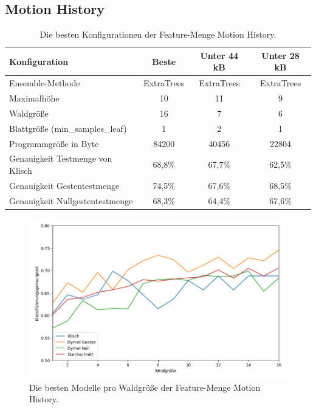 \subsection{Motion History}
\begin{table}[h!]
    \centering
    \begin{tabular}{ | l | c | c | c |}
        \hline
        Konfiguration & Beste & Unter 44 kB & Unter 28 kB \\\hline
        Ensemble-Methode & ExtraTrees & ExtraTrees & ExtraTrees \\\hline
        Maximalhöhe & 10 & 11 & 9 \\\hline
        Waldgröße & 16 & 7 & 6 \\\hline
        Blattgröße (min\_samples\_leaf) & 1 & 2 & 1 \\\hline
        Programmgröße in Byte & 84200 & 40456 & 22804 \\\hline
        Genauigkeit Testmenge von Klisch & 68,8\% & 67,7\% & 62,5\% \\\hline
        Genauigkeit Gestentestmenge & 74,5\% & 67,6\% & 68,5\% \\\hline
        Genauigkeit Nullgestentestmenge & 68,3\% & 64,4\% & 67,6\% \\\hline
    \end{tabular}
    \caption{Die besten Konfigurationen der Feature-Menge Motion History.}
    \label{tab:motion_history}
\end{table}
\begin{figure}[h!]
    \centering
    \includegraphics[width=\linewidth]{images/motion_history_acc_per_size.png}
    \caption{Die besten Modelle pro Waldgröße der Feature-Menge Motion History.}
    \label{fig:motion_history_per_forest_size}
\end{figure}
